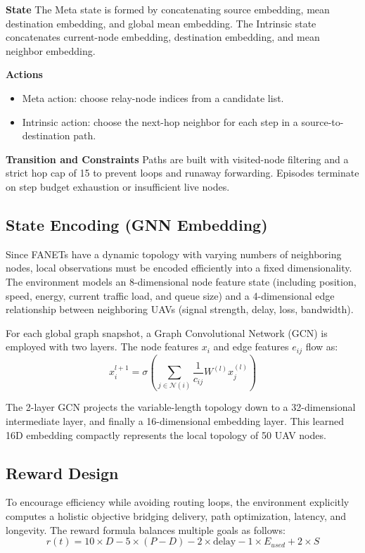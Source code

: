 \documentclass[conference]{IEEEtran}
\begin{document}
\textbf{State}
The Meta state is formed by concatenating source embedding, mean destination embedding, and global mean embedding. The Intrinsic state concatenates current-node embedding, destination embedding, and mean neighbor embedding.

\textbf{Actions}
\begin{itemize}
    \item Meta action: choose relay-node indices from a candidate list.
    \item Intrinsic action: choose the next-hop neighbor for each step in a source-to-destination path.
\end{itemize}

\textbf{Transition and Constraints}
Paths are built with visited-node filtering and a strict hop cap of 15 to prevent loops and runaway forwarding. Episodes terminate on step budget exhaustion or insufficient live nodes.

\subsection{State Encoding (GNN Embedding)}
Since FANETs have a dynamic topology with varying numbers of neighboring nodes, local observations must be encoded efficiently into a fixed dimensionality. The environment models an 8-dimensional node feature state (including position, speed, energy, current traffic load, and queue size) and a 4-dimensional edge relationship between neighboring UAVs (signal strength, delay, loss, bandwidth).

For each global graph snapshot, a Graph Convolutional Network (GCN) is employed with two layers. The node features $x_i$ and edge features $e_{ij}$ flow as:
$$ x_i^{l+1} = \sigma \left( \sum_{j \in \mathcal{N}(i)} \frac{1}{c_{ij}} W^{(l)} x_j^{(l)} \right) $$

The 2-layer GCN projects the variable-length topology down to a 32-dimensional intermediate layer, and finally a 16-dimensional embedding layer. This learned 16D embedding compactly represents the local topology of 50 UAV nodes.

\subsection{Reward Design}
To encourage efficiency while avoiding routing loops, the environment explicitly computes a holistic objective bridging delivery, path optimization, latency, and longevity. The reward formula balances multiple goals as follows:
$$ r(t) = 10 \times D - 5 \times (P - D) - 2 \times \text{delay} - 1 \times E_{used} + 2 \times S $$
\end{document}
